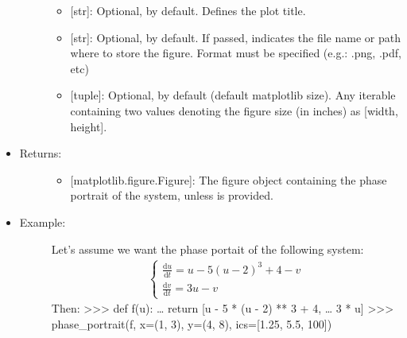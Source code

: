 \documentclass[letterpaper,10pt,english]{sphinxmanual}
\begin{document}
\begin{fulllineitems}
\begin{itemize}
\begin{description}
\begin{itemize}
\item {} 
 {[}str{]}: Optional,  by default. Defines the plot
title.

\item {} 
 {[}str{]}: Optional,  by default. If passed,
indicates the file name or path where to store the figure.
Format must be specified (e.g.: .png, .pdf, etc)

\item {} 
 {[}tuple{]}: Optional,  by default (default
matplotlib size). Any iterable containing two values denoting
the figure size (in inches) as {[}width, height{]}.

\end{itemize}

\end{description}

\item {} \begin{description}
\item[{Returns:}] \leavevmode\begin{itemize}
\item {} 
{[}matplotlib.figure.Figure{]}: The figure object containing the
phase portrait of the system, unless  is provided.

\end{itemize}

\end{description}

\item {} \begin{description}
\item[{Example:}] \leavevmode
Let’s assume we want the phase portait of the following system:
\begin{equation*}
\begin{split}\left\{\begin{array}{l}
\frac{\text{d}u}{\text{d}t}=u-5(u-2)^3+4-v\\
\frac{\text{d}v}{\text{d}t}=3u-v
\end{array}\right.\end{split}
\end{equation*}
Then:
\textgreater{}\textgreater{}\textgreater{} def f(u):
…     return {[}u - 5 * (u - 2) ** 3 + 4,
…             3 * u{]}
\textgreater{}\textgreater{}\textgreater{} phase\_portrait(f, x=(1, 3), y=(4, 8), ics={[}1.25, 5.5, 100{]})


\end{description}

\end{itemize}

\end{fulllineitems}
\end{document}
